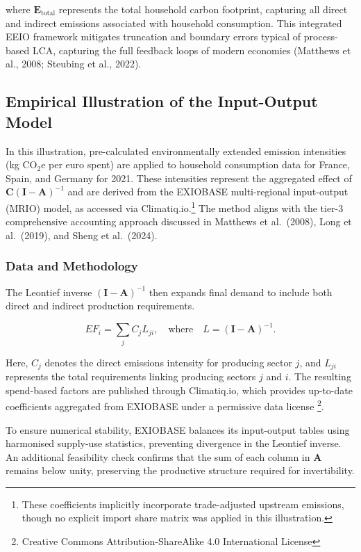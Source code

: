 \documentclass[12pt,a4paper]{article}%
\begin{document}
where \( \mathbf{E}_{\text{total}} \) represents the total household carbon footprint, capturing all direct and indirect emissions associated with household consumption.
This integrated EEIO framework mitigates truncation and boundary errors typical of process-based LCA, capturing the full feedback loops of modern economies (Matthews et al., 2008; Steubing et al., 2022).


\subsection{Empirical Illustration of the Input-Output Model}

In this illustration, pre-calculated environmentally extended emission intensities (kg CO$_{2}$e per euro spent) are applied to household consumption data for France, Spain, and Germany for 2021. These intensities represent the aggregated effect of $\mathbf{C} {(\mathbf{I}-\mathbf{A})}^{-1}$ and are derived from the EXIOBASE multi-regional input-output (MRIO) model, as accessed via Climatiq.io.\footnote{These coefficients implicitly incorporate trade-adjusted upstream emissions, though no explicit import share matrix was applied in this illustration.} The method aligns with the tier-3 comprehensive accounting approach discussed in Matthews et al.~(2008), Long et al.~(2019), and Sheng et al.~(2024).

\subsubsection{Data and Methodology}

The Leontief inverse ${(\mathbf{I} - \mathbf{A})}^{-1}$ then expands final demand to include both direct and indirect production requirements.

\begin{equation}
  EF_i = \sum_{j} C_j L_{ji}, 
\quad \text{where} \quad 
L = {(\mathbf{I} - \mathbf{A})}^{-1}.
\end{equation}



Here, $C_j$ denotes the direct emissions intensity for producing sector $j$, and $L_{ji}$ represents the total requirements linking producing sectors $j$ and $i$. The resulting spend-based factors are published through Climatiq.io, which provides up-to-date coefficients aggregated from EXIOBASE under a permissive data license \footnote{Creative Commons Attribution-ShareAlike 4.0 International License}.

To ensure numerical stability, EXIOBASE balances its input-output tables using harmonised supply-use statistics, preventing divergence in the Leontief inverse. An additional feasibility check confirms that the sum of each column in $\mathbf{A}$ remains below unity, preserving the productive structure required for invertibility.
\end{document}
